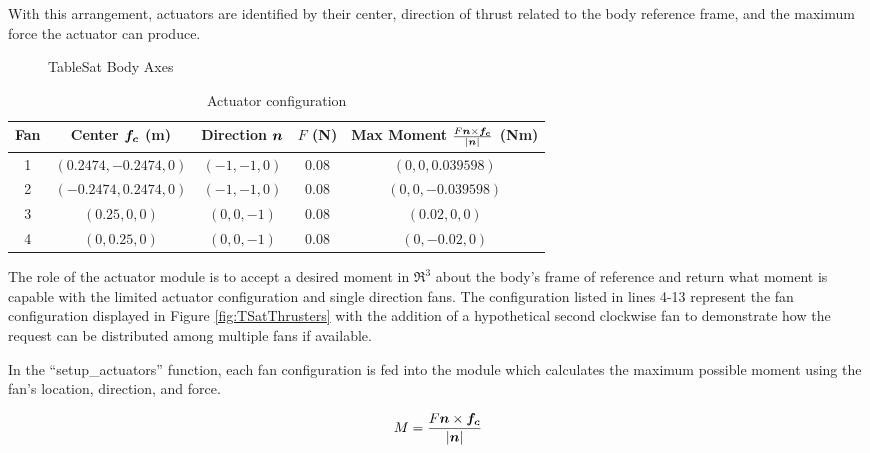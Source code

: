 With this arrangement, actuators are identified by their center, direction of thrust related to the body reference frame, and the maximum force the actuator can produce.

\begin{figure}[H]
  \centerline{}
  \caption{TableSat Body Axes}
  \label{fig:TableSatBodyAxes}
\end{figure}

\begin{table}[H]
  \centering
  \begin{tabular}{c|c|c|c|c}
    Fan & Center $\boldsymbol{f_c}$ (m) & Direction $\boldsymbol{n}$ & $F$ (N) & Max Moment $\frac{F \boldsymbol{n} \times \boldsymbol{f_c}}{|\boldsymbol{n}|}$ (Nm) \\ \hline
    1 & $(0.2474, -0.2474, 0)$ & $(-1, -1, 0)$ & 0.08 & $(0, 0, 0.039598)$ \\
    2 & $(-0.2474, 0.2474, 0)$ & $(-1, -1, 0)$ & 0.08 & $(0, 0, -0.039598)$ \\
    3 & $(0.25, 0, 0)$ & $(0, 0, -1)$ & 0.08 & $(0.02, 0, 0)$ \\
    4 & $(0, 0.25, 0)$ & $(0, 0, -1)$ & 0.08 & $(0, -0.02, 0)$ \\
  \end{tabular}
  \caption{Actuator configuration}
  \label{tbl:ActuatorConfiguration}
\end{table}


The role of the actuator module is to accept a desired moment in $\Re^3$ about the body's frame of reference and return what moment is capable with the limited actuator configuration and single direction fans.  The configuration listed in lines 4-13 represent the fan configuration displayed in Figure \ref{fig:TSatThrusters} with the addition of a hypothetical second clockwise fan to demonstrate how the request can be distributed among multiple fans if available.

In the ``setup\_actuators'' function, each fan configuration is fed into the module which calculates the maximum possible moment using the fan's location, direction, and force.

\begin{equation}
  M = \frac{F \boldsymbol{n} \times \boldsymbol{f_c}}{|\boldsymbol{n}|}
\end{equation}

